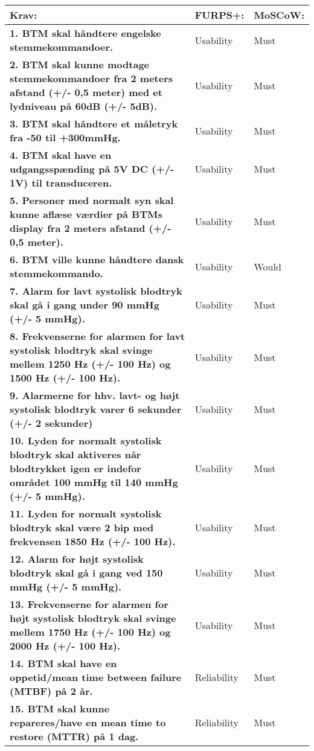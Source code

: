 \begin{table} [htbp]
\centering
\begin{tabular}{|p{10cm}|l|l|}
\hline
\textbf{Krav:} & \textbf{FURPS+:} & \textbf{MoSCoW:} \\ \hline
\textbf{1. BTM skal håndtere engelske stemmekommandoer. } & Usability & Must \\\hline
\textbf{2. BTM skal kunne modtage stemmekommandoer fra 2 meters afstand (+/- 0,5 meter) med et lydniveau på 60dB (+/- 5dB).} & Usability & Must \\ \hline
\textbf{3. BTM skal håndtere et måletryk fra -50 til +300mmHg. }  & Usability & Must \\ \hline 
\textbf{4. BTM skal have en udgangsspænding på 5V DC (+/- 1V) til transduceren.} & Usability & Must \\ \hline
\textbf{5. Personer med normalt syn skal kunne aflæse værdier på BTMs display fra 2 meters afstand (+/- 0,5 meter). } & Usability & Must \\ \hline
\textbf{6. BTM ville kunne håndtere dansk stemmekommando.} & Usability & Would \\ \hline
\textbf{7. Alarm for lavt systolisk blodtryk skal gå i gang under 90 mmHg (+/- 5 mmHg).} & Usability & Must \\ \hline
\textbf{8. Frekvenserne for alarmen for lavt systolisk blodtryk skal svinge mellem 1250 Hz (+/- 100 Hz) og 1500 Hz (+/- 100 Hz).} & Usability & Must \\ \hline
\textbf{9. Alarmerne for hhv. lavt- og højt systolisk blodtryk varer 6 sekunder (+/- 2 sekunder)} & Usability & Must \\ \hline
\textbf{10. Lyden for normalt systolisk blodtryk skal aktiveres når blodtrykket igen er indefor området 100 mmHg til 140 mmHg (+/- 5 mmHg).} & Usability & Must \\ \hline
\textbf{11. Lyden for normalt systolisk blodtryk skal være 2 bip med frekvensen 1850 Hz (+/- 100 Hz).} & Usability & Must \\ \hline
\textbf{12. Alarm for højt systolisk blodtryk skal gå i gang ved 150 mmHg (+/- 5 mmHg).} & Usability & Must \\ \hline
\textbf{13. Frekvenserne for alarmen for højt systolisk blodtryk skal svinge mellem 1750 Hz (+/- 100 Hz) og 2000 Hz (+/- 100 Hz).} & Usability & Must \\ \hline
\textbf{14. BTM skal have en oppetid/mean time between failure (MTBF) på  2 år. } & Reliability & Must \\ \hline
\textbf{15. BTM skal kunne repareres/have en mean time to restore (MTTR) på 1 dag. } & Reliability & Must \\ \hline

\end{tabular}
\end{table}
